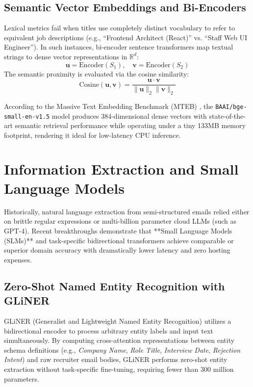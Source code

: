 \subsection{Semantic Vector Embeddings and Bi-Encoders}
Lexical metrics fail when titles use completely distinct vocabulary to refer to equivalent job descriptions (e.g., ``Frontend Architect (React)'' vs. ``Staff Web UI Engineer''). In such instances, bi-encoder sentence transformers \cite{reimers2019sentence} map textual strings to dense vector representations in $\mathbb{R}^d$:
\begin{equation}
    \mathbf{u} = \text{Encoder}(S_1), \quad \mathbf{v} = \text{Encoder}(S_2)
\end{equation}
The semantic proximity is evaluated via the cosine similarity:
\begin{equation}
    \text{Cosine}(\mathbf{u}, \mathbf{v}) = \frac{\mathbf{u} \cdot \mathbf{v}}{\|\mathbf{u}\|_2 \|\mathbf{v}\|_2}
\end{equation}

According to the Massive Text Embedding Benchmark (MTEB) \cite{muennighoff2022mteb}, the \texttt{BAAI/bge-small-en-v1.5} model \cite{xiao2023cpack} produces 384-dimensional dense vectors with state-of-the-art semantic retrieval performance while operating under a tiny 133MB memory footprint, rendering it ideal for low-latency CPU inference.

\section{Information Extraction and Small Language Models}
Historically, natural language extraction from semi-structured emails relied either on brittle regular expressions or multi-billion parameter cloud LLMs (such as GPT-4). Recent breakthroughs demonstrate that **Small Language Models (SLMs)** and task-specific bidirectional transformers achieve comparable or superior domain accuracy with dramatically lower latency and zero hosting expenses.

\subsection{Zero-Shot Named Entity Recognition with GLiNER}
GLiNER (Generalist and Lightweight Named Entity Recognition) \cite{zaratiana2024gliner} utilizes a bidirectional encoder to process arbitrary entity labels and input text simultaneously. By computing cross-attention representations between entity schema definitions (e.g., \textit{Company Name}, \textit{Role Title}, \textit{Interview Date}, \textit{Rejection Intent}) and raw recruiter email bodies, GLiNER performs zero-shot entity extraction without task-specific fine-tuning, requiring fewer than 300 million parameters.

